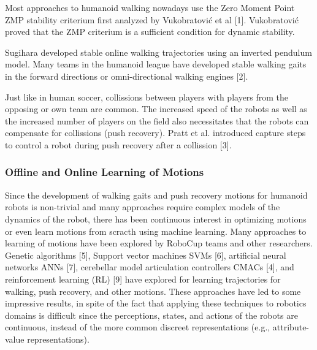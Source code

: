 \documentclass{article}
\begin{document}

Most approaches to humanoid walking nowadays use the Zero Moment Point ZMP stability criterium first analyzed by Vukobratović et al [1].
Vukobratović proved that the ZMP criterium is a sufficient condition for dynamic stability.

Sugihara developed stable online walking trajectories using an inverted pendulum model.
Many teams in the humanoid league have developed stable walking gaits in the forward directions or omni-directional walking engines [2].

Just like in human soccer, collissions between players with players from the opposing or own team are common.
The increased speed of the robots as well as the increased number of players on the field also necessitates that the robots can compensate for collissions (push recovery).
Pratt et al. introduced capture steps to control a robot during push recovery after a collission [3].

% 

\subsubsection{Offline and Online Learning of Motions}

Since the development of walking gaits and push recovery motions for humanoid robots is non-trivial and many approaches require complex models of the dynamics of the robot, there has been continuous interest in optimizing motions or even learn motions from scracth using machine learning.
Many approaches to learning of motions have been explored by RoboCup teams and other researchers.
Genetic algorithms [5], Support vector machines SVMs [6], artificial neural networks ANNs [7], cerebellar model articulation controllers CMACs [4], and reinforcement learning (RL) [9] have explored for learning trajectories for walking, push recovery, and other motions. 
These approaches have led to some impressive results, in spite of the fact that applying these techniques to robotics domains is difficult since the perceptions, states, and actions of the robots are continuous, instead of the more common discreet representations (e.g., attribute-value representations).
\end{document}
